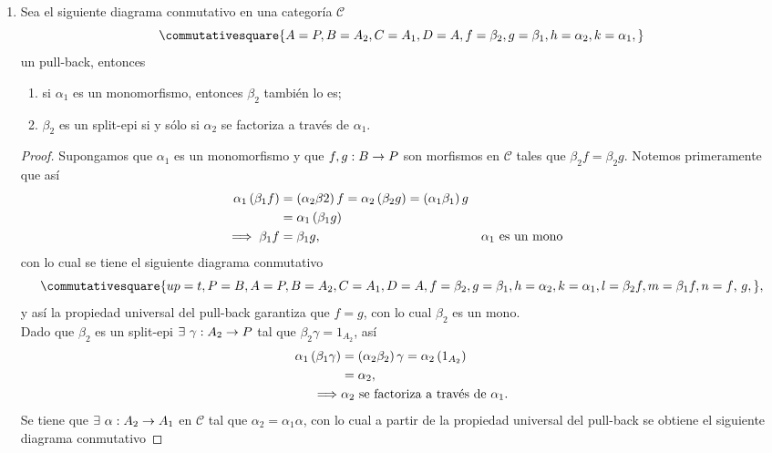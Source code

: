 \documentclass{article}
\begin{document}
\begin{enumerate}[label=\textbf{Ej \arabic*.}]
\begin{proof}
		\end{proof} 
		\item Sea el siguiente diagrama conmutativo en una categoría $\mathscr{C}$
		\begin{equation*}
			\commutativesquare{A=P,B=A_2,C=A_1,D=A,f=\beta_2,g=\beta_1,h=\alpha_2,k=\alpha_1,}
		\end{equation*}
		un pull-back, entonces
		\begin{enumerate}
			\item si $\alpha_1$ es un monomorfismo, entonces $\beta_2$ también lo es;
			\item $\beta_2$ es un split-epi si y sólo si $\alpha_2$ se factoriza a través de $\alpha_1$.
		\end{enumerate}
		\begin{proof}
			 Supongamos que $\alpha_1$ es un monomorfismo y que $\catarrow{f,g}{B}{P}{}$ son morfismos en $\mathscr{C}$ tales que $\beta_2 f=\beta_2 g$. Notemos primeramente que así
			\begin{align*}
				\alpha_1\left(\beta_1 f\right)&=\left(\alpha_2\beta 2\right)f=\alpha_2\left(\beta_2 g\right)=\left(\alpha_1\beta_1\right)g\\
				&=\alpha_1\left(\beta_1 g\right)\\
				\implies \beta_1 f&=\beta_1 g, && \alpha_1\text{ es un mono}
			\end{align*}
			con lo cual se tiene el siguiente diagrama conmutativo
			\begin{equation*}
				\commutativesquare{up=t,P=B,A=P,B=A_2,C=A_1,D=A,f=\beta_2,g=\beta_1,h=\alpha_2,k=\alpha_1,l=\beta_2 f,m=\beta_1 f,n=f\text{, }g,},
			\end{equation*}
		y así la propiedad universal del pull-back garantiza que $f=g$, con lo cual $\beta_2$ es un mono.\\
		 Dado que $\beta_2$ es un split-epi $\exists\ \catarrow{\gamma}{A_2}{P}{}$ tal que $\beta_2\gamma=1_{A_2}$, así
		\begin{align*}
			\alpha_1\left(\beta_1\gamma\right)&=\left(\alpha_2\beta_2\right)\gamma=\alpha_2\left(1_{A_2}\right)\\
			&=\alpha_2,\\
			\implies &\alpha_2\text{ se factoriza a través de }\alpha_1.
		\end{align*}
		 Se tiene que $\exists\ \catarrow{\alpha}{A_2}{A_1}{}$ en $\mathscr{C}$ tal que $\alpha_2=\alpha_1\alpha$, con lo cual a partir de la propiedad universal del pull-back se obtiene el siguiente diagrama conmutativo

\end{proof}
\end{enumerate}
\end{document}
